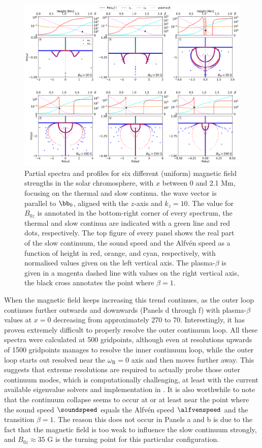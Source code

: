 \begin{figure}[t]
  \centering
  \includegraphics[width=\textwidth]{SA_chromo.png}
  \caption{
    Partial spectra and profiles for six different (uniform) magnetic field strengths in the solar chromosphere, with $x$ between 0 and 2.1 Mm, focusing on the thermal and slow continua. the wave vector is parallel to $\bb_0$, aligned with the $z$-axis and $k_z = 10$. The value for $B_{0z}$ is annotated in the bottom-right corner of every spectrum, the thermal and slow continua are indicated with a green line and red dots, respectively. The top figure of every panel shows the real part of the slow continuum, the sound speed and the Alfv\'en speed as a function of height in red, orange, and cyan, respectively, with normalised values given on the left vertical axis. The plasma-$\beta$ is given in a magenta dashed line with values on the right vertical axis, the black cross annotates the point where $\beta = 1$.
  }
  \label{fig: spectra_chromosphere}
\end{figure}

When the magnetic field keeps increasing this trend continues, as the outer loop continues further outwards and downwards (Panels d through f) with plasma-$\beta$ values at $x = 0$ decreasing from approximately 270 to 70. Interestingly, it has proven extremely difficult to properly resolve the outer continuum loop. All these spectra were calculated at 500 gridpoints, although even at resolutions upwards of 1500 gridpoints {\legolas} manages to resolve the inner continuum loop, while the outer loop starts out resolved near the $\omega_\text{R} = 0$ axis and then moves further away. This suggests that extreme resolutions are required to actually probe those outer continuum modes, which is computationally challenging, at least with the current available eigenvalue solvers and implementation in {\legolas}. It is also worthwhile to note that the continuum collapse seems to occur at or at least near the point where the sound speed $\soundspeed$ equals the Alfv\'en speed $\alfvenspeed$ and the transition $\beta = 1$. The reason this does not occur in Panels a and b is due to the fact that the magnetic field is too weak to influence the slow continuum strongly, and $B_{0z} \approx 35$ G is the turning point for this particular configuration.

